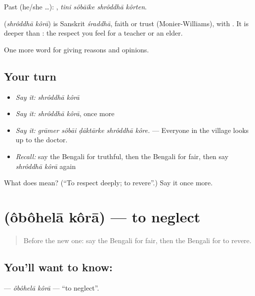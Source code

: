 Past (he/she …):    , \emph{tini sôbāike shrôddhā kôrten}.

\begin{cousinweb}
\textbf{ } (\emph{shrôddhā kôrā}) is Sanskrit \emph{śraddhā}, faith or trust (Monier-Williams), with . It is deeper than : the respect you feel for a teacher or an elder.
\end{cousinweb}

\begin{grammarlens}[title={What you've built}]
One more word for giving reasons and opinions.
\end{grammarlens}

\subsection*{Your turn}
\begin{itemize}
\raggedright
  \item \emph{Say it:} \emph{shrôddhā kôrā}
  \item \emph{Say it:} \emph{shrôddhā kôrā}, once more
  \item \emph{Say it:} \emph{grāmer sôbāi ḍāktārke shrôddhā kôre.} — Everyone in the village looks up to the doctor.
  \item \emph{Recall:} say the Bengali for truthful, then the Bengali for fair, then say \emph{shrôddhā kôrā} again
\end{itemize}

\begin{tcolorbox}[breakable,colback=teal!4,colframe=teal!35!black,title={Before you move on}]
What does   mean? (\textquotedblleft{}To respect deeply; to revere\textquotedblright{}.) Say it once more.
\end{tcolorbox}
\section[\texorpdfstring{\bn{অবহেলা} \bn{করা} (ôbôhelā kôrā)}{অবহেলা করা (ôbôhelā kôrā)}]{  (ôbôhelā kôrā) — to neglect}

\label{lesson:BN-C351-obohela-kora}



\begin{quote}
Before the new one: say the Bengali for fair, then the Bengali for to revere.
\end{quote}

\subsection*{You'll want to know:  }
\textbf{ } — \emph{ôbôhelā kôrā} — \textquotedblleft{}to neglect\textquotedblright{}.

